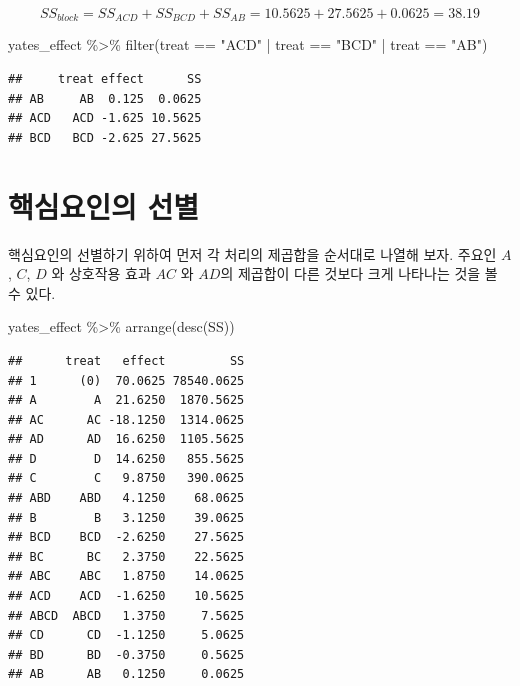 \documentclass[
]{book}
\newenvironment{Shaded}{\begin{snugshade}}{\end{snugshade}}
\newcommand{\FunctionTok}[1]{\textcolor[rgb]{0.00,0.00,0.00}{#1}}
\newcommand{\NormalTok}[1]{#1}
\newcommand{\SpecialCharTok}[1]{\textcolor[rgb]{0.00,0.00,0.00}{#1}}
\newcommand{\StringTok}[1]{\textcolor[rgb]{0.31,0.60,0.02}{#1}}
\begin{document}
\[ SS_{block} = SS_{ACD} + SS_{BCD} + SS_{AB} = 10.5625 +  27.5625 +0.0625 = 38.19 \]

\begin{Shaded}
\begin{Highlighting}[]
\NormalTok{yates\_effect }\SpecialCharTok{\%\textgreater{}\%} \FunctionTok{filter}\NormalTok{(treat }\SpecialCharTok{==} \StringTok{"ACD"} \SpecialCharTok{|}\NormalTok{ treat }\SpecialCharTok{==} \StringTok{"BCD"} \SpecialCharTok{|}\NormalTok{ treat }\SpecialCharTok{==} \StringTok{"AB"}\NormalTok{)}
\end{Highlighting}
\end{Shaded}

\begin{verbatim}
##     treat effect      SS
## AB     AB  0.125  0.0625
## ACD   ACD -1.625 10.5625
## BCD   BCD -2.625 27.5625
\end{verbatim}

\hypertarget{uxd575uxc2ecuxc694uxc778uxc758-uxc120uxbcc4}{%
\section{핵심요인의 선별}\label{uxd575uxc2ecuxc694uxc778uxc758-uxc120uxbcc4}}

핵심요인의 선별하기 위하여 먼저 각 처리의 제곱합을 순서대로 나열해 보자. 주요인 \(A\), \(C\), \(D\) 와 상호작용 효과 \(AC\) 와 \(AD\)의 제곱합이 다른 것보다 크게 나타나는 것을 볼 수 있다.

\begin{Shaded}
\begin{Highlighting}[]
\NormalTok{yates\_effect }\SpecialCharTok{\%\textgreater{}\%}  \FunctionTok{arrange}\NormalTok{(}\FunctionTok{desc}\NormalTok{(SS))}
\end{Highlighting}
\end{Shaded}

\begin{verbatim}
##      treat   effect         SS
## 1      (0)  70.0625 78540.0625
## A        A  21.6250  1870.5625
## AC      AC -18.1250  1314.0625
## AD      AD  16.6250  1105.5625
## D        D  14.6250   855.5625
## C        C   9.8750   390.0625
## ABD    ABD   4.1250    68.0625
## B        B   3.1250    39.0625
## BCD    BCD  -2.6250    27.5625
## BC      BC   2.3750    22.5625
## ABC    ABC   1.8750    14.0625
## ACD    ACD  -1.6250    10.5625
## ABCD  ABCD   1.3750     7.5625
## CD      CD  -1.1250     5.0625
## BD      BD  -0.3750     0.5625
## AB      AB   0.1250     0.0625
\end{verbatim}
\end{document}
